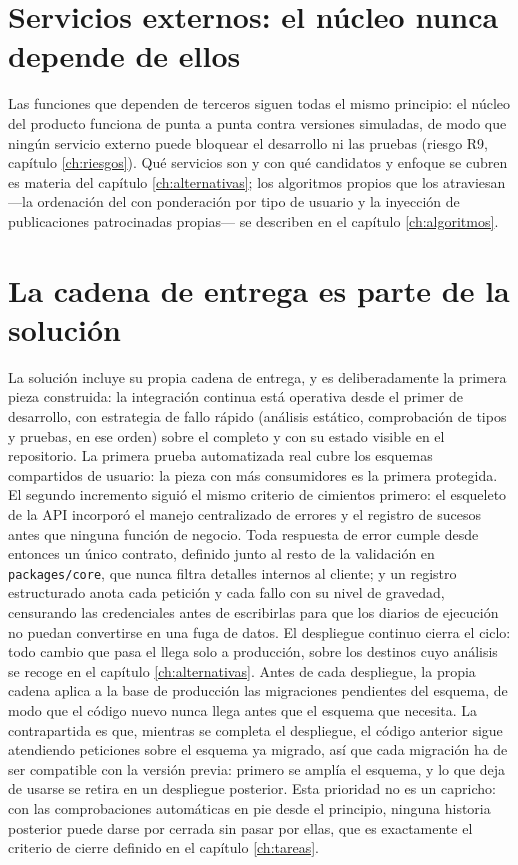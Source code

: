 \section{Servicios externos: el núcleo nunca depende de ellos}
\label{sec:solucion-servicios}

Las funciones que dependen de terceros siguen todas el mismo principio: el núcleo del producto funciona de punta a punta contra versiones simuladas, de modo que ningún servicio externo puede bloquear el desarrollo ni las pruebas (riesgo R9, capítulo \ref{ch:riesgos}).
Qué servicios son y con qué candidatos y enfoque se cubren es materia del capítulo \ref{ch:alternativas}; los algoritmos propios que los atraviesan —la ordenación del  con ponderación por tipo de usuario y la inyección de publicaciones patrocinadas propias— se describen en el capítulo \ref{ch:algoritmos}.

\section{La cadena de entrega es parte de la solución}
\label{sec:solucion-entrega}

La solución incluye su propia cadena de entrega, y es deliberadamente la primera pieza construida: la integración continua está operativa desde el primer  de desarrollo, con estrategia de fallo rápido (análisis estático, comprobación de tipos y pruebas, en ese orden) sobre el  completo y con su estado visible en el repositorio.
La primera prueba automatizada real cubre los esquemas compartidos de usuario: la pieza con más consumidores es la primera protegida.
El segundo incremento siguió el mismo criterio de cimientos primero: el esqueleto de la \ac{API} incorporó el manejo centralizado de errores y el registro de sucesos antes que ninguna función de negocio.
Toda respuesta de error cumple desde entonces un único contrato, definido junto al resto de la validación en \texttt{packages/core}, que nunca filtra detalles internos al cliente; y un registro estructurado anota cada petición y cada fallo con su nivel de gravedad, censurando las credenciales antes de escribirlas para que los diarios de ejecución no puedan convertirse en una fuga de datos.
El despliegue continuo cierra el ciclo: todo cambio que pasa el  llega solo a producción, sobre los destinos cuyo análisis se recoge en el capítulo \ref{ch:alternativas}.
Antes de cada despliegue, la propia cadena aplica a la base de producción las migraciones pendientes del esquema, de modo que el código nuevo nunca llega antes que el esquema que necesita.
La contrapartida es que, mientras se completa el despliegue, el código anterior sigue atendiendo peticiones sobre el esquema ya migrado, así que cada migración ha de ser compatible con la versión previa: primero se amplía el esquema, y lo que deja de usarse se retira en un despliegue posterior.
Esta prioridad no es un capricho: con las comprobaciones automáticas en pie desde el principio, ninguna historia posterior puede darse por cerrada sin pasar por ellas, que es exactamente el criterio de cierre definido en el capítulo \ref{ch:tareas}.

